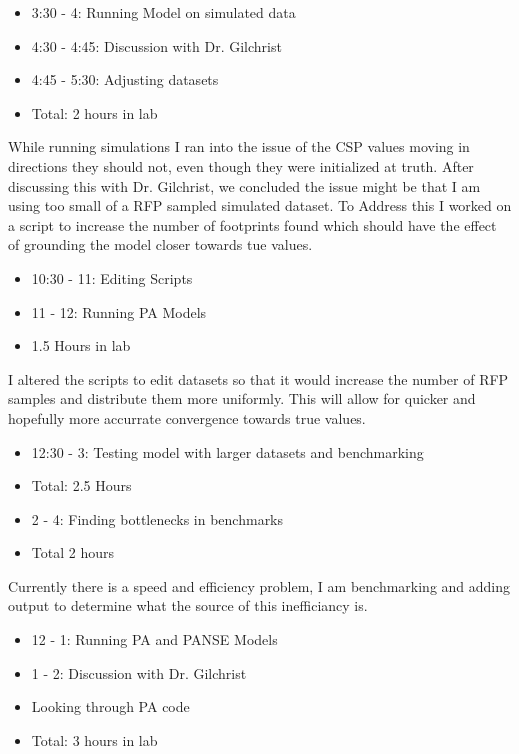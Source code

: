 \documentclass[12pt,hyperref]{labbook}
\begin{document}
\begin{itemize}
    \item 3:30 - 4: Running Model on simulated data
    \item 4:30 - 4:45: Discussion with Dr. Gilchrist
    \item 4:45 - 5:30: Adjusting datasets
    \item Total: 2 hours in lab
\end{itemize}
While running simulations I ran into the issue of the CSP values moving in directions they should not,
even though they were initialized at truth. After discussing this with Dr. Gilchrist, we concluded the
issue might be that I am using too small of a RFP sampled simulated dataset. To Address this I worked on
a script to increase the number of footprints found which should have the effect of grounding the model
closer towards tue values.
\begin{itemize}
    \item 10:30 - 11: Editing Scripts
    \item 11 - 12: Running PA Models
    \item 1.5 Hours in lab
\end{itemize}
I altered the scripts to edit datasets so that it would increase the number of RFP samples and distribute them more uniformly. This
will allow for quicker and hopefully more accurrate convergence towards true values.
\begin{itemize}
    \item 12:30 - 3: Testing model with larger datasets and benchmarking
    \item Total: 2.5 Hours
\end{itemize}
\begin{itemize}
    \item 2 - 4: Finding bottlenecks in benchmarks
    \item Total 2 hours
\end{itemize}
Currently there is a speed and efficiency problem, I am benchmarking and adding output to determine what the source of this inefficiancy is.
\begin{itemize}
    \item 12 - 1: Running PA and PANSE Models
    \item 1 - 2: Discussion with Dr. Gilchrist
    \item Looking through PA code
    \item Total: 3 hours in lab
\end{itemize}
\end{document}
